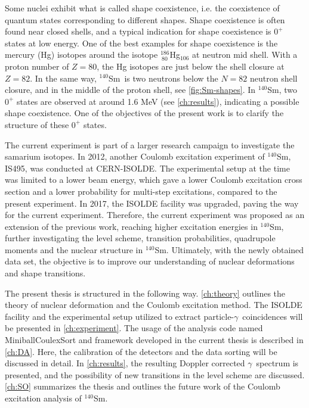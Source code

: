 \documentclass[twoside,english]{uiofysmaster/uiofysmaster}
\newcommand{\Sm}{$^{140}$Sm} %
\newcommand{\ga}{$\gamma$}
\let\orgautoref\autoref
\renewcommand{\autoref}
        {%
		 \def\sectionautorefname{Section}%
		 \def\subsectionautorefname{Section}%
		 \def\subsubsectionautorefname{Section}%
		 \def\chapterautorefname{Chapter}%
          \orgautoref}
\begin{document}
Some nuclei exhibit what is called shape coexistence, i.e. the coexistence of quantum states corresponding to different shapes.
Shape coexistence is often found near closed shells, and a typical indication for shape coexistence is $0^+$ states at low energy. 
One of the best examples for shape coexistence is the mercury (Hg) isotopes around the isotope $^{186}_{~80}$Hg$_{106}$ at neutron mid shell. 
With a proton number of $Z = 80$, the Hg isotopes are just below the shell closure at $Z = 82$. 
In the same way, \Sm\ is two neutrons below the $N = 82$ neutron shell closure, and in the middle of the proton shell, see \autoref{fig:Sm-shapes}. 
In \Sm, two $0^+$ states are observed at around 1.6 MeV (see \autoref{ch:results}), indicating a possible shape coexistence. 
One of the objectives of the present work is to clarify the structure of these $0^+$ states. 

The current experiment is part of a larger research campaign to investigate the samarium isotopes. In 2012, another Coulomb excitation experiment of \Sm, IS495, was conducted at CERN-ISOLDE. 
The experimental setup at the time was limited to a lower beam energy, which gave a lower Coulomb excitation cross section and a lower probability for multi-step excitations, compared to the present experiment. 
In 2017, the ISOLDE facility was upgraded, paving the way for the current experiment. Therefore, the current experiment was proposed as an extension of the previous work, reaching higher excitation energies in \Sm, further investigating the level scheme, transition probabilities, quadrupole moments and the nuclear structure in \Sm. 
Ultimately, with the newly obtained data set, the objective is to improve our understanding of nuclear deformations and shape transitions. 

The present thesis is structured in the following way.
\autoref{ch:theory} outlines the theory of nuclear deformation and the Coulomb excitation
method. 
The ISOLDE facility and the experimental setup utilized to extract particle-\ga\ coincidences will be presented in \autoref{ch:experiment}. 
The usage of the analysis code named MiniballCoulexSort and framework developed in the current thesis is described in \autoref{ch:DA}. 
Here, the calibration of the detectors and the data sorting will be discussed in detail. 
In \autoref{ch:results}, the resulting Doppler corrected \ga\ spectrum is presented, and the possibility of new transitions in the level scheme are discussed. 
\autoref{ch:SO} summarizes the thesis and outlines the future work of the Coulomb excitation analysis of \Sm. 
 
\end{document}
